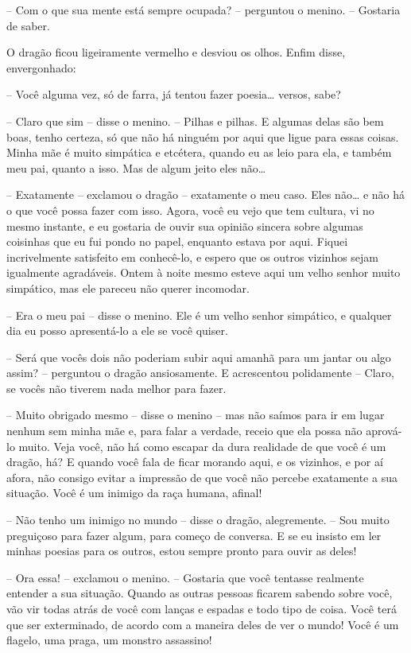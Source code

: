 -- Com o que sua mente está sempre ocupada? -- perguntou o menino. --
Gostaria de saber. 

O dragão ficou ligeiramente vermelho e desviou os olhos. Enfim disse,
envergonhado:

-- Você alguma vez, só de farra, já tentou fazer poesia… versos, sabe?

-- Claro que sim -- disse o menino. -- Pilhas e pilhas. E algumas delas
são bem boas, tenho certeza, só que não há ninguém por aqui que ligue
para essas coisas. Minha mãe é muito simpática e etcétera, quando eu
as leio para ela, e também meu pai, quanto a isso. Mas de algum jeito
eles não…

-- Exatamente -- exclamou o dragão -- exatamente o meu caso. Eles não… e
não há o que você possa fazer com isso. Agora, você eu vejo que tem
cultura, vi no mesmo instante, e eu gostaria de ouvir sua opinião
sincera sobre algumas coisinhas que eu fui pondo no papel, enquanto
estava por aqui. Fiquei incrivelmente satisfeito em conhecê-lo, e
espero que os outros vizinhos sejam igualmente agradáveis. Ontem à
noite mesmo esteve aqui um velho senhor muito simpático, mas ele
pareceu não querer incomodar.

-- Era o meu pai -- disse o menino. Ele é um velho senhor simpático, e
qualquer dia eu posso apresentá-lo a ele se você quiser.

-- Será que vocês dois não poderiam subir aqui amanhã para um jantar ou
algo assim? -- perguntou o dragão ansiosamente. E acrescentou
polidamente -- Claro, se vocês não tiverem nada melhor para fazer. 

-- Muito obrigado mesmo -- disse o menino -- mas não saímos para ir em
lugar nenhum sem minha mãe e, para falar a verdade, receio que ela
possa não aprová-lo muito. Veja você, não há como escapar da dura
realidade de que você é um dragão, há? E quando você fala de ficar
morando aqui, e os vizinhos, e por aí afora, não consigo evitar a
impressão de que você não percebe exatamente a sua situação. Você é
um inimigo da raça humana, afinal!

-- Não tenho um inimigo no mundo -- disse o dragão, alegremente. -- Sou
muito preguiçoso para fazer algum, para começo de conversa. E se eu
insisto em ler minhas poesias para os outros, estou sempre pronto
para ouvir as deles!

-- Ora essa! -- exclamou o menino. -- Gostaria que você tentasse
realmente entender a sua situação. Quando as outras pessoas ficarem
sabendo sobre você, vão vir todas atrás de você com lanças e espadas
e todo tipo de coisa. Você terá que ser exterminado, de acordo com a
maneira deles de ver o mundo! Você é um flagelo, uma praga, um
monstro assassino!

